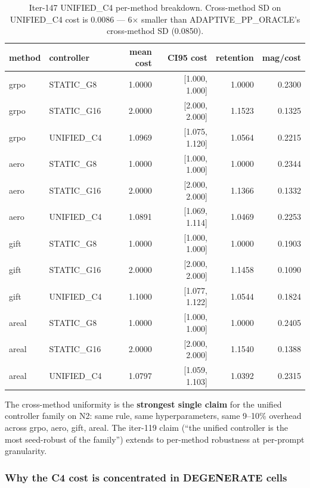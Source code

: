 \begin{table}[ht]
\centering
\small
\caption{Iter-147 UNIFIED\_C4 per-method breakdown. Cross-method SD on
UNIFIED\_C4 cost is 0.0086 --- 6$\times$ smaller than ADAPTIVE\_PP\_ORACLE's
cross-method SD (0.0850).}
\label{tab:p7-iter147-per-method}
\begin{tabular}{llrrrr}
\toprule
method & controller & mean cost & CI95 cost & retention & mag/cost \\
\midrule
grpo  & STATIC\_G8         & 1.0000 & [1.000, 1.000] & 1.0000 & 0.2300 \\
grpo  & STATIC\_G16        & 2.0000 & [2.000, 2.000] & 1.1523 & 0.1325 \\
grpo  & UNIFIED\_C4        & 1.0969 & [1.075, 1.120] & 1.0564 & 0.2215 \\
aero  & STATIC\_G8         & 1.0000 & [1.000, 1.000] & 1.0000 & 0.2344 \\
aero  & STATIC\_G16        & 2.0000 & [2.000, 2.000] & 1.1366 & 0.1332 \\
aero  & UNIFIED\_C4        & 1.0891 & [1.069, 1.114] & 1.0469 & 0.2253 \\
gift  & STATIC\_G8         & 1.0000 & [1.000, 1.000] & 1.0000 & 0.1903 \\
gift  & STATIC\_G16        & 2.0000 & [2.000, 2.000] & 1.1458 & 0.1090 \\
gift  & UNIFIED\_C4        & 1.1000 & [1.077, 1.122] & 1.0544 & 0.1824 \\
areal & STATIC\_G8         & 1.0000 & [1.000, 1.000] & 1.0000 & 0.2405 \\
areal & STATIC\_G16        & 2.0000 & [2.000, 2.000] & 1.1540 & 0.1388 \\
areal & UNIFIED\_C4        & 1.0797 & [1.059, 1.103] & 1.0392 & 0.2315 \\
\bottomrule
\end{tabular}
\end{table}

The cross-method uniformity is the \textbf{strongest single claim} for the
unified controller family on N2: same rule, same hyperparameters, same
9--10\% overhead across grpo, aero, gift, areal. The iter-119 claim
(``the unified controller is the most seed-robust of the family'') extends
to per-method robustness at per-prompt granularity.

\subsubsection*{Why the C4 cost is concentrated in DEGENERATE cells}


